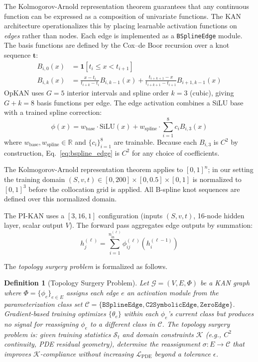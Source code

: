 \documentclass[11pt,a4paper]{article}
\newtheorem{definition}{Definition}
\begin{document}
The Kolmogorov-Arnold representation theorem \citep{kolmogorov1957representation}
guarantees that any continuous function can be expressed as a composition of
univariate functions. The KAN architecture \citep{liu_etal_2024_kan} operationalizes
this by placing learnable activation functions on \emph{edges} rather than nodes.
Each edge is implemented as a \texttt{BSplineEdge} module. The basis functions are
defined by the Cox--de Boor recursion over a knot sequence $\mathbf{t}$:
\begin{align}
B_{i,0}(x) &= \mathbf{1}[t_i \leq x < t_{i+1}] \label{eq:cox_de_boor_1} \\
B_{i,k}(x) &= \frac{x - t_i}{t_{i+k} - t_i} B_{i,k-1}(x)
             + \frac{t_{i+k+1} - x}{t_{i+k+1} - t_{i+1}} B_{i+1,k-1}(x)
\label{eq:cox_de_boor_2}
\end{align}
OpKAN uses $G=5$ interior intervals and spline order $k=3$ (cubic), giving $G+k=8$
basis functions per edge. The edge activation combines a SiLU base with a trained
spline correction:
\begin{equation}
\phi(x) = w_\text{base} \cdot \text{SiLU}(x)
         + w_\text{spline} \cdot \sum_{i=1}^{8} c_i B_{i,3}(x)
\label{eq:bspline_edge}
\end{equation}
where $w_\text{base}, w_\text{spline} \in \mathbb{R}$ and $\{c_i\}_{i=1}^8$ are
trainable. Because each $B_{i,3}$ is $C^2$ by construction, Eq.~\eqref{eq:bspline_edge}
is $C^2$ for any choice of coefficients.

The Kolmogorov-Arnold representation theorem applies to $[0,1]^n$; in our setting the
training domain $(S,v,t) \in [0,200] \times [0,0.5] \times [0,1]$ is normalized to
$[0,1]^3$ before the collocation grid is applied. All B-spline knot sequences are
defined over this normalized domain.

The PI-KAN uses a $[3, 16, 1]$ configuration (inputs $(S,v,t)$, 16-node hidden layer,
scalar output $V$). The forward pass aggregates edge outputs by summation:
\begin{equation}
h_j^{(\ell)} = \sum_{i=1}^{n_\text{in}^{(\ell)}} \phi_{ij}^{(\ell)}\!\left(h_i^{(\ell-1)}\right)
\label{eq:kan_forward}
\end{equation}

The \emph{topology surgery problem} is formalized as follows.

\begin{definition}[Topology Surgery Problem]
Let $\mathcal{G} = (V, E, \Phi)$ be a KAN graph where $\Phi = \{\phi_e\}_{e \in E}$
assigns each edge $e$ an activation module from the parameterization class set
$\mathcal{C} = \{\texttt{BSplineEdge}, \texttt{C2SymbolicEdge}, \texttt{ZeroEdge}\}$.
Gradient-based training optimizes $\{\theta_e\}$ within each $\phi_e$'s current class
but produces no signal for reassigning $\phi_e$ to a different class in $\mathcal{C}$.
The \emph{topology surgery problem} is: given training statistics $\mathcal{S}_t$ and
domain constraints $\mathcal{K}$ (e.g., $C^2$ continuity, PDE residual geometry),
determine the reassignment $\sigma: E \to \mathcal{C}$ that improves $\mathcal{K}$-compliance
without increasing $\mathcal{L}_\text{PDE}$ beyond a tolerance $\epsilon$.
\end{definition}
\end{document}
